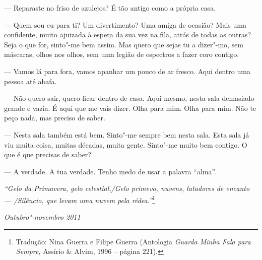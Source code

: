 --- Reparaste no friso de azulejos? É tão antigo como a própria casa.

--- Quem sou eu para ti? Um divertimento? Uma amiga de ocasião? Mais uma
  confidente, muito ajuizada à espera da sua vez na fila, atrás de todas
  as outras? Seja o que for, sinto"-me bem assim. Mas quero que sejas tu
  a dizer"-mo, sem máscaras, olhos nos olhos, sem uma legião de espectros
  a fazer coro contigo.

--- Vamos lá para fora, vamos apanhar um pouco de ar
fresco. Aqui dentro uma pessoa até abafa.

--- Não quero sair, quero ficar dentro de casa. Aqui mesmo, nesta sala
  demasiado grande e vazia. É aqui que me vais dizer. Olha para mim.
  Olha para mim. Não te peço nada, mas preciso de saber.

--- Nesta sala também está bem. Sinto"-me sempre bem nesta sala. Esta sala
  já viu muita coisa, muitas décadas, muita gente. Sinto"-me muito bem
  contigo. O que é que precisas de saber?

--- A verdade. A tua verdade. Tenho medo de usar a palavra ``alma''.

\emph{``Gelo da Primavera, gelo celestial,/Gelo primevo, nuvens,
lutadores de encanto --- /Silêncio, que levam uma nuvem pela
rédea.''}\footnote{Tradução: Nina Guerra e Filipe Guerra
(Antologia \emph{Guarda Minha Fala para Sempre, }Assírio \& Alvim, 1996
-- página 221).}

\begin{flushright}
\emph{Outubro"-novembro 2011}
\end{flushright}

